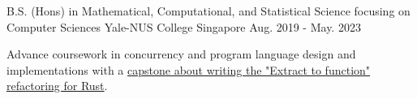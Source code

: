 

\begin{cventries}

  \cventry
    {B.S. (Hons) in Mathematical, Computational, and Statistical Science focusing on Computer Sciences} %
    {Yale-NUS College} %
    {Singapore} %
    {Aug. 2019 - May. 2023} %
    {
      \begin{cvitems} %
        \item {Advance coursework in concurrency and program language design and implementations with a \href{https://www.google.com}{capstone about writing the "Extract to function" refactoring for Rust}.}  
      \end{cvitems}
    }

\end{cventries}

